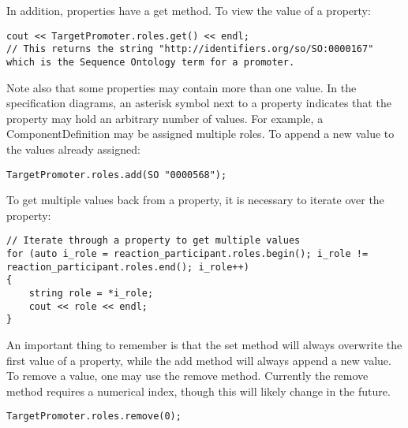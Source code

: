 In addition, properties have a get method. To view the value of a property:

\vspace{\abovedisplayskip}
\begin{minipage}{0.95\textwidth} 
\begin{lstlisting}
cout << TargetPromoter.roles.get() << endl;
// This returns the string "http://identifiers.org/so/SO:0000167" which is the Sequence Ontology term for a promoter.
\end{lstlisting}
\end{minipage}

Note also that some properties may contain more than one value. In the specification diagrams, an asterisk symbol next to a property indicates that the property may hold an arbitrary number of values. For example, a ComponentDefinition may be assigned multiple roles. To append a new value to the values already assigned:

\vspace{\abovedisplayskip}
\begin{minipage}{0.95\textwidth} 
\begin{lstlisting}
TargetPromoter.roles.add(SO "0000568");
\end{lstlisting}
\end{minipage}

To get multiple values back from a property, it is necessary to iterate over the property:

\vspace{\abovedisplayskip}
\begin{minipage}{0.95\textwidth} 
\begin{lstlisting}
// Iterate through a property to get multiple values
for (auto i_role = reaction_participant.roles.begin(); i_role != reaction_participant.roles.end(); i_role++)
{
    string role = *i_role;
    cout << role << endl;
}
\end{lstlisting}
\end{minipage}

An important thing to remember is that the set method will always overwrite the first value of a property, while the add method will always append a new value. To remove a value, one may use the remove method. Currently the remove method requires a numerical index, though this will likely change in the future.

\vspace{\abovedisplayskip}
\begin{minipage}{0.95\textwidth} 
\begin{lstlisting}
TargetPromoter.roles.remove(0);
\end{lstlisting}
\end{minipage}


